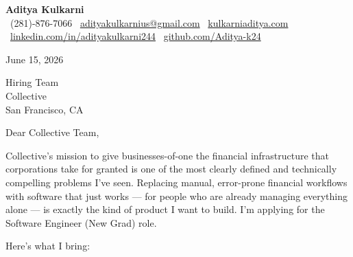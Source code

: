 \documentclass[11pt]{article}
\begin{document}
\begin{center}
  {\LARGE \textbf{Aditya Kulkarni}} \\[4pt]
  \small
  \faPhone\ (281)-876-7066 \quad
  \faEnvelope\ \href{mailto:adityakulkarnius@gmail.com}{adityakulkarnius@gmail.com} \quad
  \faGlobe\ \href{https://www.kulkarniaditya.com}{kulkarniaditya.com} \quad
  \faLinkedin\ \href{https://www.linkedin.com/in/adityakulkarni244/}{linkedin.com/in/adityakulkarni244} \quad
  \faGithub\ \href{https://github.com/Aditya-k24}{github.com/Aditya-k24}
\end{center}

\vspace{6pt}

June 15, 2026

\vspace{6pt}

Hiring Team \\
Collective \\
San Francisco, CA

\vspace{10pt}

Dear Collective Team,

\vspace{6pt}

Collective's mission to give businesses-of-one the financial infrastructure that corporations take for granted is one of the most clearly defined and technically compelling problems I've seen. Replacing manual, error-prone financial workflows with software that just works — for people who are already managing everything alone — is exactly the kind of product I want to build. I'm applying for the Software Engineer (New Grad) role.

\vspace{8pt}

Here's what I bring:
\end{document}

